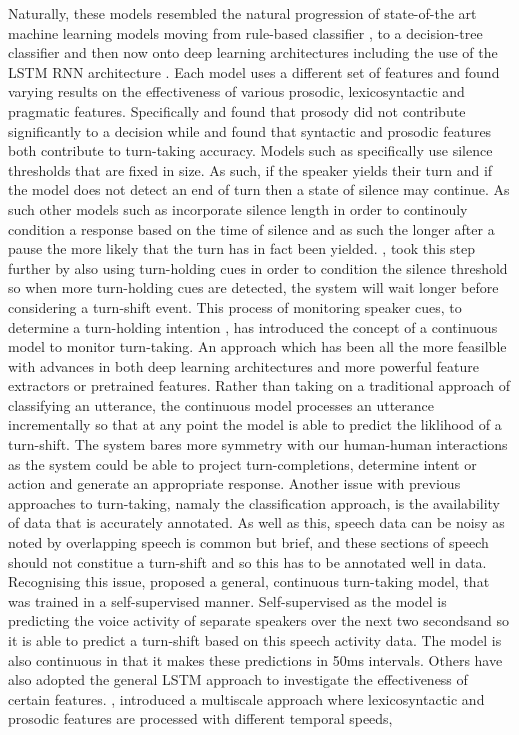 \documentclass[logo,bsc,singlespacing,parskip]{infthesis}
\begin{document}
Naturally, these models resembled the natural progression of state-of-the art machine learning models moving from rule-based classifier \cite{Bell2001}, to a decision-tree classifier \cite{Sato2002, Ferrer2002, Schlangen2006, Meena2014, RauxEsk2008} and then now onto deep learning architectures including the use of the LSTM RNN architecture \cite{Maier2017}. 
Each model uses a different set of features and found varying results on the effectiveness of various prosodic, lexicosyntactic and pragmatic features. Specifically \cite{Sato2002} and \cite{Meena2014} found that prosody did not contribute significantly to a decision while \cite{Ferrer2002} and \cite{Schlangen2006} found that syntactic and prosodic features both contribute to turn-taking accuracy. 
Models such as \cite{Sato2002, Schlangen2006, Meena2014} specifically use silence thresholds that are fixed in size. As such, if the speaker yields their turn and if the model does not detect an end of turn then a state of silence may continue. As such other models such as \cite{Ferrer2002, Rau2008} incorporate silence length in order to continouly condition a response based on the time of silence and as such the longer after a pause the more likely that the turn has in fact been yielded. \cite{Raux2008}, took this step further by also using turn-holding cues in order to condition the silence threshold so when more turn-holding cues are detected, the system will wait longer before considering a turn-shift event. 
This process of monitoring speaker cues, to determine a turn-holding intention \cite{Raux2008}, has introduced the concept of a continuous model to monitor turn-taking. An approach which has been all the more feasilble with advances in both deep learning architectures and more powerful feature extractors or pretrained features. Rather than taking on a traditional approach of classifying an utterance, the continuous model processes an utterance incrementally so that at any point the model is able to predict the liklihood of a turn-shift. The system bares more symmetry with our human-human interactions as the system could be able to project turn-completions, determine intent or action and generate an appropriate response. 
Another issue with previous approaches to turn-taking, namaly the classification approach, is the availability of data that is accurately annotated. As well as this, speech data can be noisy as noted by \cite{Sacks1974} overlapping speech is common but brief, and these sections of speech should not constitue a turn-shift and so this has to be annotated well in data. Recognising this issue, \cite{Skantze2017} proposed a general, continuous turn-taking model, that was trained in a self-supervised manner. Self-supervised as the model is predicting the voice activity of separate speakers over the next two secondsand so it is able to predict a turn-shift based on this speech activity data. The model is also continuous in that it makes these predictions in 50ms intervals. 
Others have also adopted the general LSTM approach \cite{Roddy2018a, Ward2019} to investigate the effectiveness of certain features. , \cite{Roddy2018} introduced a multiscale approach where lexicosyntactic and prosodic features are processed with different temporal speeds, 
\end{document}
